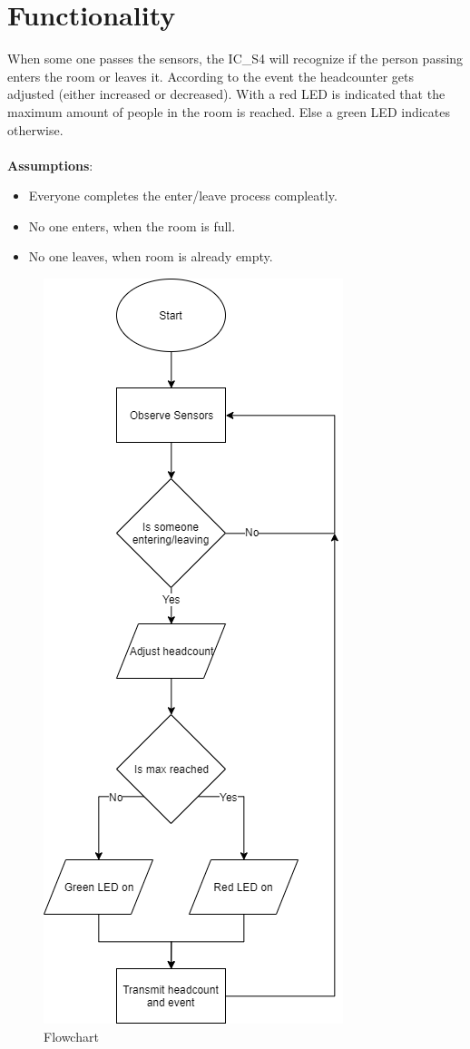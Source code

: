 \documentclass[12pt,a4 paper] {report}
\begin{document}
\section*{Functionality}
When some one passes the sensors, the IC\_S4 will recognize if the person passing enters the room or leaves it. 
According to the event the headcounter gets adjusted (either increased or decreased). With a red LED is indicated that 
the maximum amount of people in the room is reached. Else a green LED indicates otherwise. \\ \\
\textbf{Assumptions}:
\begin{itemize}
	\item Everyone completes the enter/leave process compleatly.
	\item No one enters, when the room is full.
	\item No one leaves, when room is already empty.
\end{itemize}
\begin{figure}[h]
	\centering	
	\includegraphics[scale=0.5]{../png/flowchart.png}
	\caption{Flowchart}
\end{figure}
\end{document}
